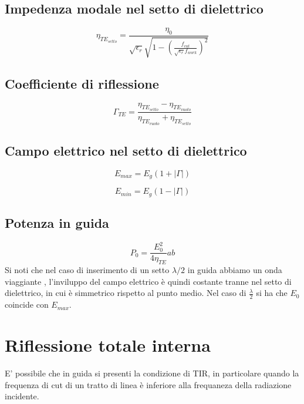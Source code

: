 		\subsection{Impedenza modale nel setto di dielettrico}

				\begin{equation}
				\eta_{TE_{setto}}=\frac{\eta_0}{\sqrt{\epsilon_r} \sqrt{ 1- ( \frac {f_{cut}} {\sqrt{\epsilon_r} f_{work}} )^2 } }
				\end{equation}

		\subsection{Coefficiente di riflessione}

			\begin{equation}
			\Gamma_{TE}=\frac{\eta_{TE_{setto}}-\eta_{TE_{vuoto}}}{\eta_{TE_{vuoto}}+\eta_{TE_{setto}}}
			\end{equation}
		\subsection{Campo elettrico nel setto di dielettrico}
		\begin{equation}
		E_{max}=E_g(1+|\Gamma|)
		\end{equation}

		\begin{equation}
		E_{min}=E_g(1-|\Gamma|)
		\end{equation}


		\subsection{Potenza in guida}
				\begin{equation}
				P_0=\frac{E_0^2}{4\eta_{TE}}ab
				\end{equation}
				Si noti che nel caso di inserimento di un setto $\lambda/2$ in guida abbiamo un onda viaggiante , l'inviluppo del campo elettrico è quindi costante tranne nel setto di dielettrico, in cui è simmetrico rispetto al punto medio.
				Nel caso di $\frac{\lambda}{2}$ si ha che $E_0$ coincide con $E_{max}$.
	\section{Riflessione totale interna}

		E' possibile che in guida si presenti la condizione di TIR, in particolare quando la frequenza di cut di un tratto di linea è inferiore alla frequaneza della radiazione incidente.

